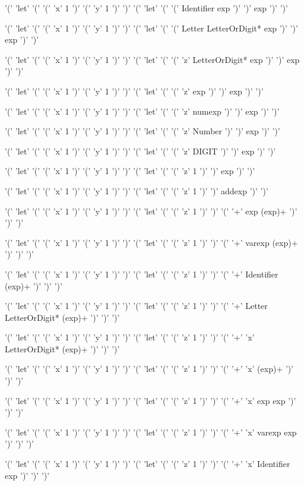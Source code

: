 \documentclass[11pt]{article}
\begin{document}
\begin{enumerate}
	'(' 'let' '(' '(' 'x' 1 ')' '(' 'y' 1 ')' ')' '(' 'let' '(' '(' Identifier exp ')' ')' exp ')' ')'

	'(' 'let' '(' '(' 'x' 1 ')' '(' 'y' 1 ')' ')' '(' 'let' '(' '(' Letter LetterOrDigit* exp ')' ')' exp ')' ')'

	'(' 'let' '(' '(' 'x' 1 ')' '(' 'y' 1 ')' ')' '(' 'let' '(' '(' 'z' LetterOrDigit* exp ')' ')' exp ')' ')'

	'(' 'let' '(' '(' 'x' 1 ')' '(' 'y' 1 ')' ')' '(' 'let' '(' '(' 'z' exp ')' ')' exp ')' ')'

	'(' 'let' '(' '(' 'x' 1 ')' '(' 'y' 1 ')' ')' '(' 'let' '(' '(' 'z' numexp ')' ')' exp ')' ')'

	'(' 'let' '(' '(' 'x' 1 ')' '(' 'y' 1 ')' ')' '(' 'let' '(' '(' 'z' Number ')' ')' exp ')' ')'

	'(' 'let' '(' '(' 'x' 1 ')' '(' 'y' 1 ')' ')' '(' 'let' '(' '(' 'z' DIGIT ')' ')' exp ')' ')'

	'(' 'let' '(' '(' 'x' 1 ')' '(' 'y' 1 ')' ')' '(' 'let' '(' '(' 'z' 1 ')' ')' exp ')' ')'

	'(' 'let' '(' '(' 'x' 1 ')' '(' 'y' 1 ')' ')' '(' 'let' '(' '(' 'z' 1 ')' ')' addexp ')' ')'

	'(' 'let' '(' '(' 'x' 1 ')' '(' 'y' 1 ')' ')' '(' 'let' '(' '(' 'z' 1 ')' ')' '(' '+' exp (exp)+ ')' ')' ')'

	'(' 'let' '(' '(' 'x' 1 ')' '(' 'y' 1 ')' ')' '(' 'let' '(' '(' 'z' 1 ')' ')' '(' '+' varexp (exp)+ ')' ')' ')'

	'(' 'let' '(' '(' 'x' 1 ')' '(' 'y' 1 ')' ')' '(' 'let' '(' '(' 'z' 1 ')' ')' '(' '+' Identifier (exp)+ ')' ')' ')'

	'(' 'let' '(' '(' 'x' 1 ')' '(' 'y' 1 ')' ')' '(' 'let' '(' '(' 'z' 1 ')' ')' '(' '+' Letter LetterOrDigit* (exp)+ ')' ')' ')'

	'(' 'let' '(' '(' 'x' 1 ')' '(' 'y' 1 ')' ')' '(' 'let' '(' '(' 'z' 1 ')' ')' '(' '+' 'x' LetterOrDigit* (exp)+ ')' ')' ')'

	'(' 'let' '(' '(' 'x' 1 ')' '(' 'y' 1 ')' ')' '(' 'let' '(' '(' 'z' 1 ')' ')' '(' '+' 'x' (exp)+ ')' ')' ')'

	'(' 'let' '(' '(' 'x' 1 ')' '(' 'y' 1 ')' ')' '(' 'let' '(' '(' 'z' 1 ')' ')' '(' '+' 'x' exp exp ')' ')' ')'

	'(' 'let' '(' '(' 'x' 1 ')' '(' 'y' 1 ')' ')' '(' 'let' '(' '(' 'z' 1 ')' ')' '(' '+' 'x' varexp exp ')' ')' ')'

	'(' 'let' '(' '(' 'x' 1 ')' '(' 'y' 1 ')' ')' '(' 'let' '(' '(' 'z' 1 ')' ')' '(' '+' 'x' Identifier exp ')' ')' ')'


\end{enumerate}
\end{document}
